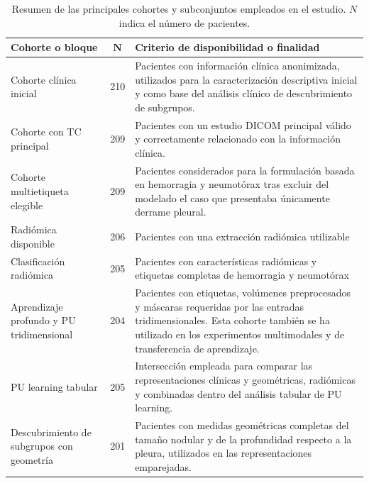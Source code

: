 \begin{table}[!htbp]
\centering
\small
\renewcommand{\arraystretch}{1.15}
\caption{Resumen de las principales cohortes y subconjuntos empleados en el estudio. \(N\) indica el número de pacientes.}
\label{tab:resumen_cohortes}
\begin{tabularx}{\textwidth}{p{4.0cm}cX}
\toprule
\textbf{Cohorte o bloque} & \(\boldsymbol{N}\) & \textbf{Criterio de disponibilidad o finalidad} \\
\midrule

Cohorte clínica inicial
& 210
& Pacientes con información clínica anonimizada, utilizados para la caracterización descriptiva inicial y como base del análisis clínico de descubrimiento de subgrupos. \\

Cohorte con TC principal
& 209
& Pacientes con un estudio DICOM principal válido y correctamente relacionado con la información clínica. \\

Cohorte multietiqueta elegible
& 209
& Pacientes considerados para la formulación basada en hemorragia y neumotórax tras excluir del modelado el caso que presentaba únicamente derrame pleural. \\

Radiómica disponible
& 206
& Pacientes con una extracción radiómica utilizable \\

Clasificación radiómica
& 205
& Pacientes con características radiómicas y etiquetas completas de hemorragia y neumotórax \\

Aprendizaje profundo y PU tridimensional
& 204
& Pacientes con etiquetas, volúmenes preprocesados y máscaras requeridas por las entradas tridimensionales. Esta cohorte también se ha utilizado en los experimentos multimodales y de transferencia de aprendizaje. \\

PU learning tabular
& 205
& Intersección empleada para comparar las representaciones clínicas y geométricas, radiómicas y combinadas dentro del análisis tabular de PU learning. \\

Descubrimiento de subgrupos con geometría
& 201
& Pacientes con medidas geométricas completas del tamaño nodular y de la profundidad respecto a la pleura, utilizados en las representaciones emparejadas. \\


\end{tabularx}
\end{table}
